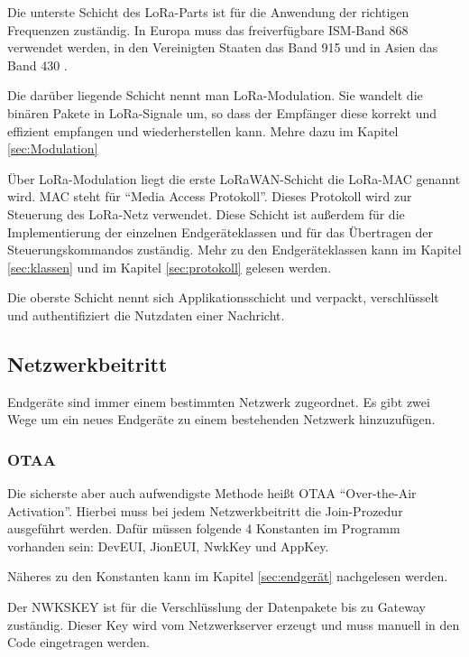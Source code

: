 \documentclass[a4paper, 12pt]{article}
\begin{document}
            Die unterste Schicht des LoRa-Parts ist für die Anwendung der richtigen Frequenzen zuständig. In Europa 
            muss das freiverfügbare ISM-Band 868 verwendet werden, in den Vereinigten Staaten das Band 915 und 
            in Asien das Band 430 .\cite[S.7]{WhatIsLoRa}

            Die darüber liegende Schicht nennt man LoRa-Modulation. Sie wandelt die binären Pakete in 
            LoRa-Signale um, so dass der Empfänger diese korrekt und effizient empfangen und wiederherstellen 
            kann. Mehre dazu im Kapitel  \ref{sec:Modulation} 

            Über LoRa-Modulation liegt die erste LoRaWAN-Schicht die LoRa-MAC genannt wird. MAC steht für ``Media Access 
            Protokoll''. Dieses Protokoll wird zur Steuerung des LoRa-Netz verwendet. Diese Schicht ist außerdem für 
            die Implementierung der einzelnen Endgeräteklassen 
            und für das Übertragen der Steuerungskommandos zuständig. Mehr zu den Endgeräteklassen kann im Kapitel 
            \ref{sec:klassen}  und im Kapitel \ref{sec:protokoll}  gelesen werden.

            Die oberste Schicht nennt sich Applikationsschicht und verpackt, verschlüsselt und authentifiziert 
            die Nutzdaten einer Nachricht.
        \subsection{Netzwerkbeitritt}
            Endgeräte sind immer einem bestimmten Netzwerk zugeordnet. Es gibt zwei Wege um ein neues Endgeräte zu einem 
            bestehenden Netzwerk hinzuzufügen.
            \subsubsection{OTAA} \label{sec:OTAA}
                Die sicherste aber auch aufwendigste Methode heißt 
                OTAA ``Over-the-Air Activation''. Hierbei muss bei jedem Netzwerkbeitritt die Join-Prozedur ausgeführt
                werden. Dafür müssen folgende 4 Konstanten im Programm vorhanden sein: DevEUI, 
                JionEUI, NwkKey und AppKey.

                Näheres zu den Konstanten kann im Kapitel \ref{sec:endgerät}  nachgelesen werden.

                Der NWKSKEY ist für die Verschlüsslung der Datenpakete bis zu Gateway zuständig. Dieser Key wird 
                vom Netzwerkserver erzeugt und muss manuell in den Code eingetragen werden.\cite[S.3]{LoRaSecur}
            
\end{document}
